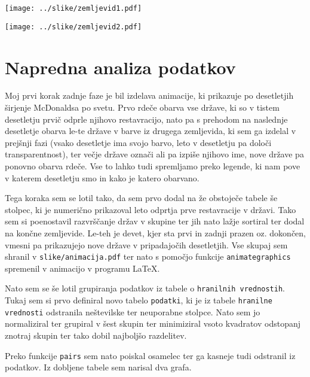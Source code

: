 \documentclass[11pt,a4paper]{article}
\begin{document}
\begin{sidewaysfigure}[ht]
	\texttt{[image: ../slike/zemljevid1.pdf]}
\end{sidewaysfigure}



\begin{sidewaysfigure}[ht]
	\texttt{[image: ../slike/zemljevid2.pdf]}
\end{sidewaysfigure}

\newpage

\section{Napredna analiza podatkov}

Moj prvi korak zadnje faze je bil izdelava animacije, ki prikazuje po desetletjih širjenje McDonaldsa po svetu. Prvo rdeče obarva vse države, ki so v tistem desetletju prvič odprle njihovo restavracijo, nato pa s prehodom na naslednje desetletje obarva le-te države v barve iz drugega zemljevida, ki sem ga izdelal v prejšnji fazi (vsako desetletje ima svojo barvo, leto v desetletju pa določi transparentnost), ter večje države označi ali pa izpiše njihovo ime, nove države pa ponovno obarva rdeče. Vse to lahko tudi spremljamo preko legende, ki nam pove v katerem desetletju smo in kako je katero obarvano. \par
Tega koraka sem se lotil tako, da sem prvo dodal na že obstoječe tabele še stolpec, ki je numerično prikazoval leto odprtja prve restavracije v državi. Tako sem si poenostavil razvrščanje držav v skupine ter jih nato lažje sortiral ter dodal na končne zemljevide. Le-teh je devet, kjer sta prvi in zadnji prazen oz. dokončen, vmesni pa prikazujejo nove države v pripadajočih desetletjih. Vse skupaj sem shranil v \verb|slike/animacija.pdf| ter nato s pomočjo funkcije \verb|animategraphics| spremenil v animacijo v programu \LaTeX. \par
\vspace{1em}
\noindent
Nato sem se še lotil grupiranja podatkov iz tabele o \verb|hranilnih vrednostih|. Tukaj sem si prvo definiral novo tabelo \verb|podatki|, ki je iz tabele \verb|hranilne| \verb|vrednosti| odstranila neštevilske ter neuporabne stolpce. Nato sem jo normaliziral ter grupiral v šest skupin ter minimiziral vsoto kvadratov odstopanj znotraj skupin ter tako dobil najboljšo razdelitev. \par
Preko funkcije \verb|pairs| sem nato poiskal osamelec ter ga kasneje tudi odstranil iz podatkov. Iz dobljene tabele sem narisal dva grafa.
\end{document}
